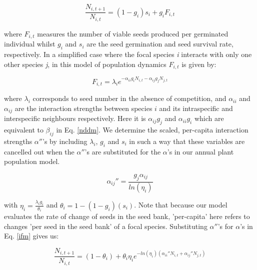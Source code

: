 \documentclass[a4,12pt]{article}
\begin{document}
            \begin{equation}
                \frac{N_{i, t+1}}{N_{i, t}} = \left( 1 - g_{i} \right) s_{i} + g_{i}F_{i, t}
                \label{ifm}
            \end{equation}
        
        where \(F_{i,t}\) measures the number of viable seeds produced per germinated individual whilst \(g_{i}\) and \(s_{i}\) are the seed germination and seed survival rate, respectively. In a simplified case where the focal species \textit{i} interacts with only one other species \textit{j}, in this model of population dynamics \(F_{i,t}\) is given by:

            \begin{equation}
                F_{i,t} = \lambda_{i} e^{- \alpha_{ii} g_{i} N_{i, t} -  \alpha_{ij} g_{j} N_{j, t} }
                \label{fecundity}   
            \end{equation}

        where \(\lambda_{i}\) corresponds to seed number in the absence of competition, and \(\alpha_{ii}\) and \(\alpha_{ij}\) are the interaction strengths between species \(i\) and its intraspecific and interspecific neighbours respectively. Here it is \(\alpha_{ij} g_{j}\) and \(\alpha_{ii} g_{i}\) which are equivalent to \(\beta_{ij}\) in Eq. \ref{nddm}. 
        We determine the scaled, per-capita interaction strengths ${\alpha}''$'s by including \(\lambda_{i}\), \(g_{i}\) and \(s_{i}\) in such a way that these variables are cancelled out when the ${\alpha}''$'s are substituted for the $\alpha$'s in our annual plant population model. 

        \begin{equation}
            {\alpha_{ij}}'' = \frac{g_{j} \alpha_{ij}}{ln(\eta_{i})}
        \end{equation}

        with $\eta_{i} = \frac{\lambda_{i} g_{i}}{\theta_{i}}$ and $\theta_{i} = 1 - (1 - g_{i})(s_{i})$. %
        Note that because our model evaluates the rate of change of seeds in the seed bank, 'per-capita' here refers to changes 'per seed in the seed bank' of a focal species. Substituting ${\alpha}''$'s for $\alpha$'s in Eq. \ref{ifm} gives us: 
        
        \begin{equation}
            \frac{N_{i, t+1}}{N_{i, t}} = (1 - \theta_{i}) + \theta_{i} \eta_{i} e^{-ln(\eta_{i})({\alpha_{ii}}'' N_{i, t} + {\alpha_{ij}}'' N_{j, t})}
        \end{equation}
\end{document}
